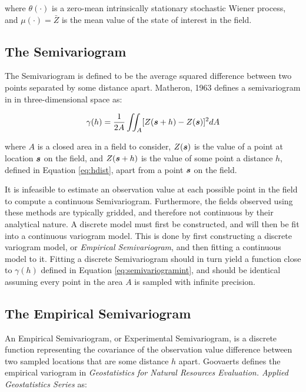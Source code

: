 \noindent where $\theta(\cdot)$ is a zero-mean intrinsically stationary stochastic Wiener process, and $\mu(\cdot) = \bar{Z}$ is the mean value of the state of interest in the field.

\subsection{The Semivariogram}
The Semivariogram is defined to be the average squared difference between two points separated by some distance apart. Matheron, 1963 defines a semivariogram in \cite{matheron:geostat} in three-dimensional space as:

\begin{equation}
    \gamma(h) = \frac{1}{2A} \iint_A [ Z({\it{\boldsymbol{s}}} + h) - Z({\it{\boldsymbol{s}}}) ]^2 dA
    \label{eq:semivariogramint}
\end{equation}

\noindent where $A$ is a closed area in a field to consider, $Z({\it{\boldsymbol{s}}})$ is the value of a point at location ${\it{\boldsymbol{s}}}$ on the field, and $Z({\it{\boldsymbol{s}}} + h)$ is the value of some point a distance $h$, defined in Equation \ref{eq:hdist}, apart from a point ${\it{\boldsymbol{s}}}$ on the field.

It is infeasible to estimate an observation value at each possible point in the field to compute a continuous Semivariogram. Furthermore, the fields observed using these methods are typically gridded, and therefore not continuous by their analytical nature. A discrete model must first be constructed, and will then be fit into a continuous variogram model. This is done by first constructing a discrete variogram model, or \textit{Empirical Semivariogram}, and then fitting a continuous model to it. Fitting a discrete Semivariogram should in turn yield a function close to $\gamma(h)$ defined in Equation \ref{eq:semivariogramint}, and should be identical assuming every point in the area $A$ is sampled with infinite precision.

\subsection{The Empirical Semivariogram}
An Empirical Semivariogram, or Experimental Semivariogram, is a discrete function representing the covariance of the observation value difference between two sampled locations that are some distance $h$ apart. Goovaerts defines the empirical variogram in \textit{Geostatistics for Natural Resources Evaluation. Applied Geostatistics Series} \cite{goov:97} as:

